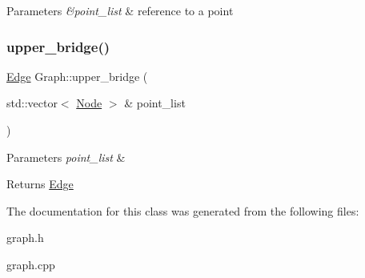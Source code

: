 \begin{DoxyParams}{Parameters}
{\em \&point\+\_\+list} & reference to a point \\
\hline
\end{DoxyParams}
\mbox{\label{classGraph_a52305b31ad2a6ad8eb200b9413bed9be}} 
\subsubsection{\texorpdfstring{upper\+\_\+bridge()}{upper\_bridge()}}
{\footnotesize\ttfamily \hyperlink{classEdge}{Edge} Graph\+::upper\+\_\+bridge (\begin{DoxyParamCaption}\item[{std\+::vector$<$ \hyperlink{classNode}{Node} $>$ \&}]{point\+\_\+list }\end{DoxyParamCaption})}


\begin{DoxyParams}{Parameters}
{\em point\+\_\+list} & \\
\hline
\end{DoxyParams}
\begin{DoxyReturn}{Returns}
\hyperlink{classEdge}{Edge} 
\end{DoxyReturn}


The documentation for this class was generated from the following files\+:\begin{DoxyCompactItemize}
\item 
graph.\+h\item 
graph.\+cpp\end{DoxyCompactItemize}
